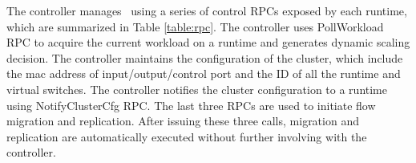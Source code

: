 The controller manages \nfactor~using a series of control RPCs exposed by each runtime, which are summarized in Table \ref{table:rpc}. The controller uses PollWorkload RPC to acquire the current workload on a runtime and generates dynamic scaling decision. The controller maintains the configuration of the cluster, which include the mac address of input/output/control port and the ID of all the runtime and virtual switches. The controller notifies the cluster configuration to a runtime using NotifyClusterCfg RPC. The last three RPCs are used to initiate flow migration and replication. After issuing these three calls, migration and replication are automatically executed without further involving with the controller.

\begin{table}[!h]
\centering
\caption{Control RPCs exposed from each runtime.}
\label{table:rpc}
\end{table}
